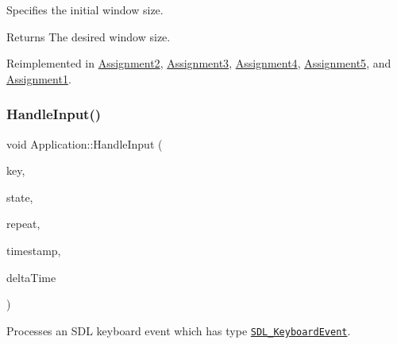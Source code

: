 Specifies the initial window size.

\begin{DoxyReturn}{Returns}
The desired window size.
\end{DoxyReturn}


Reimplemented in \hyperlink{class_assignment2_a9ea79bd468c12dde5159ca7b8efd8e1e}{Assignment2}, \hyperlink{class_assignment3_aec48ba5500d906963fdac555ee47cb72}{Assignment3}, \hyperlink{class_assignment4_ad197b75e730f9b32458429df8d55458e}{Assignment4}, \hyperlink{class_assignment5_ac199b6149ffa3dbedc7e0d49bb24c628}{Assignment5}, and \hyperlink{class_assignment1_a581b6c897c918eede3f9bbb1cbc50320}{Assignment1}.

\hypertarget{class_application_ae6074c3f102de1cb2fe4c81b545679db}{}\label{class_application_ae6074c3f102de1cb2fe4c81b545679db}
\subsubsection{\texorpdfstring{Handle\+Input()}{HandleInput()}}
{\footnotesize\ttfamily void Application\+::\+Handle\+Input (\begin{DoxyParamCaption}\item[{S\+D\+L\+\_\+\+Keysym}]{key,  }\item[{Uint32}]{state,  }\item[{Uint8}]{repeat,  }\item[{double}]{timestamp,  }\item[{double}]{delta\+Time }\end{DoxyParamCaption})\hspace{0.3cm}{\ttfamily [virtual]}}



Processes an S\+DL keyboard event which has type \href{https://wiki.libsdl.org/SDL_KeyboardEvent}{\tt S\+D\+L\+\_\+\+Keyboard\+Event}.



